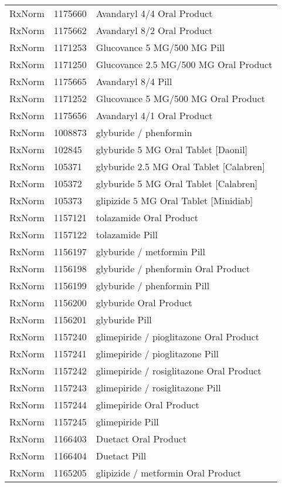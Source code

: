 \begin{longtable}{p{}p{}p{}}
  RxNorm & 1175660 & Avandaryl 4/4 Oral Product \\ 
  RxNorm & 1175662 & Avandaryl 8/2 Oral Product \\ 
  RxNorm & 1171253 & Glucovance 5 MG/500 MG Pill \\ 
  RxNorm & 1171250 & Glucovance 2.5 MG/500 MG Oral Product \\ 
  RxNorm & 1175665 & Avandaryl 8/4 Pill \\ 
  RxNorm & 1171252 & Glucovance 5 MG/500 MG Oral Product \\ 
  RxNorm & 1175656 & Avandaryl 4/1 Oral Product \\ 
  RxNorm & 1008873 & glyburide / phenformin \\ 
  RxNorm & 102845 & glyburide 5 MG Oral Tablet [Daonil] \\ 
  RxNorm & 105371 & glyburide 2.5 MG Oral Tablet [Calabren] \\ 
  RxNorm & 105372 & glyburide 5 MG Oral Tablet [Calabren] \\ 
  RxNorm & 105373 & glipizide 5 MG Oral Tablet [Minidiab] \\ 
  RxNorm & 1157121 & tolazamide Oral Product \\ 
  RxNorm & 1157122 & tolazamide Pill \\ 
  RxNorm & 1156197 & glyburide / metformin Pill \\ 
  RxNorm & 1156198 & glyburide / phenformin Oral Product \\ 
  RxNorm & 1156199 & glyburide / phenformin Pill \\ 
  RxNorm & 1156200 & glyburide Oral Product \\ 
  RxNorm & 1156201 & glyburide Pill \\ 
  RxNorm & 1157240 & glimepiride / pioglitazone Oral Product \\ 
  RxNorm & 1157241 & glimepiride / pioglitazone Pill \\ 
  RxNorm & 1157242 & glimepiride / rosiglitazone Oral Product \\ 
  RxNorm & 1157243 & glimepiride / rosiglitazone Pill \\ 
  RxNorm & 1157244 & glimepiride Oral Product \\ 
  RxNorm & 1157245 & glimepiride Pill \\ 
  RxNorm & 1166403 & Duetact Oral Product \\ 
  RxNorm & 1166404 & Duetact Pill \\ 
  RxNorm & 1165205 & glipizide / metformin Oral Product \\ 

\end{longtable}
